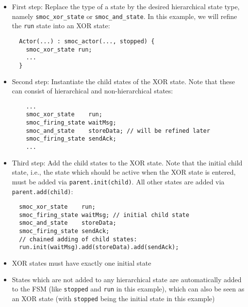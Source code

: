 \begin{frame}[fragile=singleslide]
\begin{itemize}
\item First step: Replace the type of a state by the desired hierarchical state type, namely \texttt{smoc\_xor\_state} or \texttt{smoc\_and\_state}.  In this example, we will refine the \texttt{run} state into an XOR state:
\begin{lstlisting}
  Actor(...) : smoc_actor(..., stopped) {
    smoc_xor_state run;
    ...
  }
\end{lstlisting}
\item Second step: Instantiate the child states of the XOR state. Note that these can consist of hierarchical and non-hierarchical states:
\begin{lstlisting}
    ...    
    smoc_xor_state    run;
    smoc_firing_state waitMsg;
    smoc_and_state    storeData; // will be refined later
    smoc_firing_state sendAck;
    ...
\end{lstlisting}
\end{itemize}
\end{frame}

\begin{frame}[fragile=singleslide]
\begin{itemize}
\item Third step: Add the child states to the XOR state. Note that the initial child state, i.e., the state which should be active when the XOR state is entered, must be added via \texttt{parent.init(child)}. All other states are added via \texttt{parent.add(child)}:
\begin{lstlisting}
  smoc_xor_state    run;
  smoc_firing_state waitMsg; // initial child state
  smoc_and_state    storeData;
  smoc_firing_state sendAck;
  // chained adding of child states:
  run.init(waitMsg).add(storeData).add(sendAck);
\end{lstlisting}
\item XOR states must have exactly one initial state
\item States which are not added to any hierarchical state are automatically added to the FSM (like \texttt{stopped} and \texttt{run} in this example), which can also be seen as an XOR state (with \texttt{stopped} being the initial state in this example)
\end{itemize}
\end{frame}

